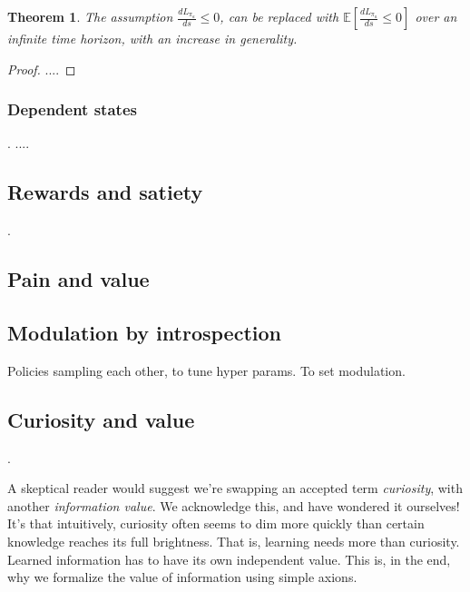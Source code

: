 \documentclass[9pt,twocolumn,twoside]{pnas-new}
\newtheorem{theorem}{Theorem}
\begin{document}
\begin{theorem}
    The assumption $\frac{dL_{\pi_{a}}}{ds} \leq 0$, can be replaced with $\mathbb{E} [\frac{dL_{\pi_{a}}}{ds} \leq 0]$ over an infinite time horizon, with an increase in generality.
\end{theorem}
\begin{proof}
....
\end{proof}


\subsubsection*{Dependent states}.
....


\subsection*{Rewards and satiety}.

\subsection{Pain and value}

\subsection{Modulation by introspection}
Policies sampling each other, to tune hyper params. To set modulation.



\subsection*{Curiosity and value}.

A skeptical reader would suggest we're swapping an accepted term \textit{curiosity}, with another \textit{information value}. We acknowledge this, and have wondered it ourselves! It's that intuitively, curiosity often seems to dim more quickly than certain knowledge reaches its full brightness. That is, learning needs more than curiosity. Learned information has to have its own independent value. This is, in the end, why we formalize the value of information using simple axions. 
\end{document}
